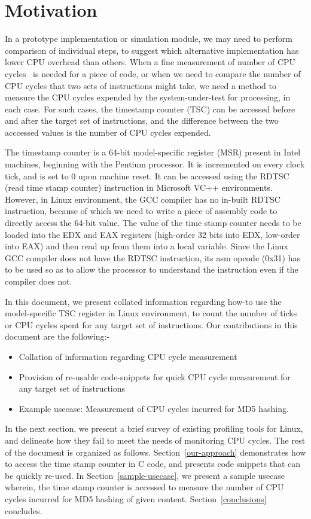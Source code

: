 \section{Motivation}

In a prototype implementation or simulation module, we may need to 
perform comparison of individual steps, to suggest which
alternative implementation has lower CPU overhead than others.
When a fine measurement of number of CPU cycles~\cite{iodedup} is needed 
for a piece of code, or when we need to compare the number of CPU cycles
that two sets of instructions might take, we need a
method to measure the CPU cycles expended by the 
system-under-test for processing, in each case. For such cases, the timestamp
counter (TSC) can be accessed before and after the target set of instructions,
and the difference between the two acccessed values is the number of CPU 
cycles expended.

The timestamp counter is a 64-bit model-specific register (MSR) present in Intel
machines, beginning with the Pentium processor\cite{rdtscpm1}. It is incremented
on every clock tick, and is set to 0 upon machine reset. It can be 
accessed using the RDTSC (read time stamp counter)
instruction in Microsoft VC++ environments. However, in Linux environment, the
GCC compiler has no in-built RDTSC instruction, because of which we need
to write a piece of assembly code to directly access the 64-bit value. 
The value of the time stamp counter needs to be loaded into the EDX and
EAX registers (high-order 32 bits into EDX, low-order into EAX) 
and then read up from them into a local variable. Since the Linux GCC compiler
does not have the RDTSC instruction, its asm opcode (0x31) has to be used
so as to allow the processor to understand the instruction even if the 
compiler does not.

In this document, we present collated information regarding how-to use the
model-specific TSC register in Linux environment, to count the number
of ticks or CPU cycles spent for any target set of instructions. 
Our contributions in this document are the following:-
\begin{itemize}
\item Collation of information regarding CPU cycle measurement
\item Provision of re-usable code-snippets for quick CPU cycle measurement for any target set of instructions
\item Example usecase: Measurement of CPU cycles incurred for MD5 hashing.
\end{itemize}

In the next section, we present a brief survey of existing profiling tools
for Linux, and delineate how they fail to meet the needs of monitoring CPU
cycles. The rest of the document is organized as follows.
Section~\ref{our-approach} demonstrates how to access the time stamp counter
in C code, and presents code snippets that can be quickly re-used. In
Section~\ref{sample-usecase}, we present a sample usecase wherein, the
time stamp counter is accessed to measure the number of CPU cycles 
incurred for MD5 hashing of given content. Section~\ref{conclusions} concludes.
